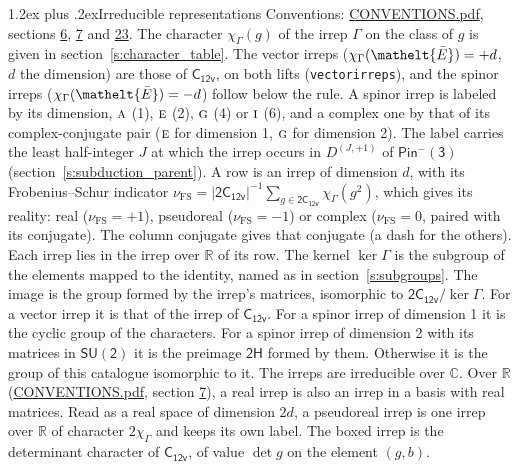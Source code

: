 \documentclass[10pt,a4paper]{article}
\makeatletter
\renewcommand\section{\@startsection{section}{1}{\z@}{-3ex plus -1ex minus -.2ex}%
  {1.2ex plus .2ex}{\normalfont\large\sffamily\bfseries\color{parttitle}}}
\numberwithin{equation}{section}
\newcommand{\eltfont}[1]{{\let\sigma\eltsigma\mathelt{#1}}}
\newcommand{\grp}[1]{\mathsf{#1}}
\newcommand{\irr}[1]{\text{\normalfont\scshape #1}}
\newcommand{\elt}[1]{\eltfont{#1}}
\newcommand{\irrJp}[2]{D^{(#1,#2)}}
\newcommand{\irchar}[1]{\chi_{#1}}
\newcommand{\fsind}{\nu_{\mathrm{FS}}}
\newcommand{\barred}[1]{\bar{#1}}
\makeatother
\begin{document}
\section{Irreducible representations}\label{s:irreps}
Conventions: \href{../../CONVENTIONS.pdf}{CONVENTIONS.pdf}, sections \href{../../../rotation/CONVENTIONS.pdf\#conv.6}{6}, \href{../../../rotation/CONVENTIONS.pdf\#conv.7}{7} and \href{../../CONVENTIONS.pdf\#conv.23}{23}.
\leavevmode\label{n:function.character}\label{n:irrep.Gamma}The character $\irchar{\Gamma}(g)$ of the irrep $\Gamma$ on the class of $g$ is given in section~\ref{s:character_table}. \label{n:index.dimension}The vector irreps ($\irchar{\Gamma}(\elt{\barred{E}}) = +d$, $d$ the dimension) are those of \href{../../../rotation/data/pdf/C12v.pdf}{$\grp{C_{12v}}$}, on both lifts (\texttt{vectorirreps}), and the spinor irreps ($\irchar{\Gamma}(\elt{\barred{E}}) = -d$) follow below the rule. A spinor irrep is labeled by its dimension, $\irr{a}$ (1), $\irr{e}$ (2), $\irr{g}$ (4) or $\irr{i}$ (6), and a complex one by that of its complex-conjugate pair ($\irr{e}$ for dimension 1, $\irr{g}$ for dimension 2). The label carries the least half-integer $J$ at which the irrep occurs in $\irrJp{J}{+1}$ of $\grp{Pin^{-}(3)}$ (section~\ref{s:subduction_parent}).
\leavevmode\label{n:index.frobenius}\label{n:head.irrep}\label{n:head.reality}A row is an irrep of dimension $d$, with its Frobenius--Schur indicator $\fsind = |\grp{2C_{12v}}|^{-1}\allowbreak\sum_{g\in\grp{2C_{12v}}}\irchar{\Gamma}(g^2)$, which gives its reality: real ($\fsind = +1$), pseudoreal ($\fsind = -1$) or complex ($\fsind = 0$, paired with its conjugate). \label{n:head.conjugate}The column conjugate gives that conjugate (a dash for the others). \label{n:head.over.real}Each irrep lies in the irrep over $\mathbb{R}$ of its row. \label{n:head.kernel}The kernel $\ker\Gamma$ is the subgroup of the elements mapped to the identity, named as in section~\ref{s:subgroups}. \label{n:head.image}The image is the group formed by the irrep's matrices, isomorphic to $\grp{2C_{12v}}/\ker\Gamma$. For a vector irrep it is that of the irrep of \href{../../../rotation/data/pdf/C12v.pdf}{$\grp{C_{12v}}$}. For a spinor irrep of dimension 1 it is the cyclic group of the characters. For a spinor irrep of dimension 2 with its matrices in $\grp{SU(2)}$ it is the preimage $\grp{2H}$ formed by them. Otherwise it is the group of this catalogue isomorphic to it. The irreps are irreducible over $\mathbb{C}$. Over $\mathbb{R}$ (\href{../../CONVENTIONS.pdf}{CONVENTIONS.pdf}, section \href{../../../rotation/CONVENTIONS.pdf\#conv.7}{7}), a real irrep is also an irrep in a basis with real matrices. Read as a real space of dimension $2d$, a pseudoreal irrep is one irrep over $\mathbb{R}$ of character $2\irchar{\Gamma}$ and keeps its own label. \label{n:mark.determinant}The boxed irrep is the determinant character of \href{../../../rotation/data/pdf/C12v.pdf}{$\grp{C_{12v}}$}, of value $\det g$ on the element $(g, b)$.
\end{document}
